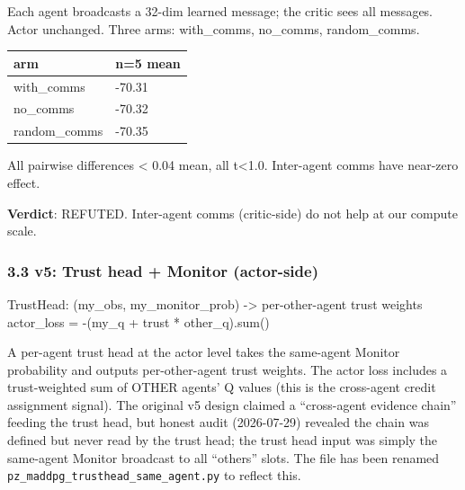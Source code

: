 \documentclass[
]{article}
\newenvironment{Shaded}{}{}
\newcommand{\BuiltInTok}[1]{\textcolor[rgb]{0.00,0.50,0.00}{#1}}
\newcommand{\NormalTok}[1]{#1}
\newcommand{\OperatorTok}[1]{\textcolor[rgb]{0.40,0.40,0.40}{#1}}
\newcounter{none} %
\begin{document}
Each agent broadcasts a 32-dim learned message; the critic sees all
messages. Actor unchanged. Three arms: with\_comms, no\_comms,
random\_comms.

{\def\LTcaptype{none} %
\begin{longtable}[]{@{}ll@{}}
\toprule\noalign{}
arm & n=5 mean \\
\midrule\noalign{}
\endhead
\bottomrule\noalign{}
\endlastfoot
with\_comms & -70.31 \\
no\_comms & -70.32 \\
random\_comms & -70.35 \\
\end{longtable}
}

All pairwise differences \textless{} 0.04 mean, all t\textless1.0.
Inter-agent comms have near-zero effect.

\textbf{Verdict}: REFUTED. Inter-agent comms (critic-side) do not help
at our compute scale.

\subsubsection{3.3 v5: Trust head + Monitor
(actor-side)}\label{v5-trust-head-monitor-actor-side}

\begin{Shaded}
\begin{Highlighting}[]
\NormalTok{TrustHead: (my\_obs, my\_monitor\_prob) }\OperatorTok{{-}\textgreater{}}\NormalTok{ per}\OperatorTok{{-}}\NormalTok{other}\OperatorTok{{-}}\NormalTok{agent trust weights}
\NormalTok{actor\_loss }\OperatorTok{=} \OperatorTok{{-}}\NormalTok{(my\_q }\OperatorTok{+}\NormalTok{ trust }\OperatorTok{*}\NormalTok{ other\_q).}\BuiltInTok{sum}\NormalTok{()}
\end{Highlighting}
\end{Shaded}

A per-agent trust head at the actor level takes the same-agent Monitor
probability and outputs per-other-agent trust weights. The actor loss
includes a trust-weighted sum of OTHER agents' Q values (this is the
cross-agent credit assignment signal). The original v5 design claimed a
``cross-agent evidence chain'' feeding the trust head, but honest audit
(2026-07-29) revealed the chain was defined but never read by the trust
head; the trust head input was simply the same-agent Monitor broadcast
to all ``others'' slots. The file has been renamed
\texttt{pz\_maddpg\_trusthead\_same\_agent.py} to reflect this.
\end{document}
